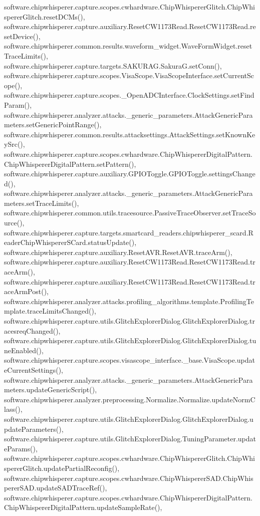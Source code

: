 software.\+chipwhisperer.\+capture.\+scopes.\+cwhardware.\+Chip\+Whisperer\+Glitch.\+Chip\+Whisperer\+Glitch.\+reset\+D\+C\+Ms(), software.\+chipwhisperer.\+capture.\+auxiliary.\+Reset\+C\+W1173\+Read.\+Reset\+C\+W1173\+Read.\+reset\+Device(), software.\+chipwhisperer.\+common.\+results.\+waveform\+\_\+widget.\+Wave\+Form\+Widget.\+reset\+Trace\+Limits(), software.\+chipwhisperer.\+capture.\+targets.\+S\+A\+K\+U\+R\+A\+G.\+Sakura\+G.\+set\+Conn(), software.\+chipwhisperer.\+capture.\+scopes.\+Visa\+Scope.\+Visa\+Scope\+Interface.\+set\+Current\+Scope(), software.\+chipwhisperer.\+capture.\+scopes.\+\_\+\+Open\+A\+D\+C\+Interface.\+Clock\+Settings.\+set\+Find\+Param(), software.\+chipwhisperer.\+analyzer.\+attacks.\+\_\+generic\+\_\+parameters.\+Attack\+Generic\+Parameters.\+set\+Generic\+Point\+Range(), software.\+chipwhisperer.\+common.\+results.\+attacksettings.\+Attack\+Settings.\+set\+Known\+Key\+Src(), software.\+chipwhisperer.\+capture.\+scopes.\+cwhardware.\+Chip\+Whisperer\+Digital\+Pattern.\+Chip\+Whisperer\+Digital\+Pattern.\+set\+Pattern(), software.\+chipwhisperer.\+capture.\+auxiliary.\+G\+P\+I\+O\+Toggle.\+G\+P\+I\+O\+Toggle.\+settings\+Changed(), software.\+chipwhisperer.\+analyzer.\+attacks.\+\_\+generic\+\_\+parameters.\+Attack\+Generic\+Parameters.\+set\+Trace\+Limits(), software.\+chipwhisperer.\+common.\+utils.\+tracesource.\+Passive\+Trace\+Observer.\+set\+Trace\+Source(), software.\+chipwhisperer.\+capture.\+targets.\+smartcard\+\_\+readers.\+chipwhisperer\+\_\+scard.\+Reader\+Chip\+Whisperer\+S\+Card.\+status\+Update(), software.\+chipwhisperer.\+capture.\+auxiliary.\+Reset\+A\+V\+R.\+Reset\+A\+V\+R.\+trace\+Arm(), software.\+chipwhisperer.\+capture.\+auxiliary.\+Reset\+C\+W1173\+Read.\+Reset\+C\+W1173\+Read.\+trace\+Arm(), software.\+chipwhisperer.\+capture.\+auxiliary.\+Reset\+C\+W1173\+Read.\+Reset\+C\+W1173\+Read.\+trace\+Arm\+Post(), software.\+chipwhisperer.\+analyzer.\+attacks.\+profiling\+\_\+algorithms.\+template.\+Profiling\+Template.\+trace\+Limits\+Changed(), software.\+chipwhisperer.\+capture.\+utils.\+Glitch\+Explorer\+Dialog.\+Glitch\+Explorer\+Dialog.\+tracesreq\+Changed(), software.\+chipwhisperer.\+capture.\+utils.\+Glitch\+Explorer\+Dialog.\+Glitch\+Explorer\+Dialog.\+tune\+Enabled(), software.\+chipwhisperer.\+capture.\+scopes.\+visascope\+\_\+interface.\+\_\+base.\+Visa\+Scope.\+update\+Current\+Settings(), software.\+chipwhisperer.\+analyzer.\+attacks.\+\_\+generic\+\_\+parameters.\+Attack\+Generic\+Parameters.\+update\+Generic\+Script(), software.\+chipwhisperer.\+analyzer.\+preprocessing.\+Normalize.\+Normalize.\+update\+Norm\+Class(), software.\+chipwhisperer.\+capture.\+utils.\+Glitch\+Explorer\+Dialog.\+Glitch\+Explorer\+Dialog.\+update\+Parameters(), software.\+chipwhisperer.\+capture.\+utils.\+Glitch\+Explorer\+Dialog.\+Tuning\+Parameter.\+update\+Params(), software.\+chipwhisperer.\+capture.\+scopes.\+cwhardware.\+Chip\+Whisperer\+Glitch.\+Chip\+Whisperer\+Glitch.\+update\+Partial\+Reconfig(), software.\+chipwhisperer.\+capture.\+scopes.\+cwhardware.\+Chip\+Whisperer\+S\+A\+D.\+Chip\+Whisperer\+S\+A\+D.\+update\+S\+A\+D\+Trace\+Ref(), software.\+chipwhisperer.\+capture.\+scopes.\+cwhardware.\+Chip\+Whisperer\+Digital\+Pattern.\+Chip\+Whisperer\+Digital\+Pattern.\+update\+Sample\+Rate(), 